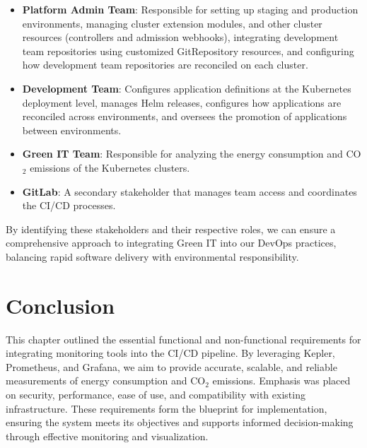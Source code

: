 \begin{itemize}
  \item \textbf{Platform Admin Team}: Responsible for setting up staging and production environments, managing cluster extension modules, and other cluster resources (controllers and admission webhooks), integrating development team repositories using customized GitRepository resources, and configuring how development team repositories are reconciled on each cluster.
  
  \item \textbf{Development Team}: Configures application definitions at the Kubernetes deployment level, manages Helm releases, configures how applications are reconciled across environments, and oversees the promotion of applications between environments.
  
  \item \textbf{Green IT Team}: Responsible for analyzing the energy consumption and CO$_2$ emissions of the Kubernetes clusters. 
  
  \item \textbf{GitLab}: A secondary stakeholder that manages team access and coordinates the CI/CD processes.
\end{itemize}

By identifying these stakeholders and their respective roles, we can ensure a comprehensive approach to integrating Green IT into our DevOps practices, balancing rapid software delivery with environmental responsibility.


\section{Conclusion}

This chapter outlined the essential functional and non-functional requirements for integrating monitoring tools into the CI/CD pipeline. By leveraging Kepler, Prometheus, and Grafana, we aim to provide accurate, scalable, and reliable measurements of energy consumption and CO$_2$ emissions. Emphasis was placed on security, performance, ease of use, and compatibility with existing infrastructure. These requirements form the blueprint for implementation, ensuring the system meets its objectives and supports informed decision-making through effective monitoring and visualization.



















